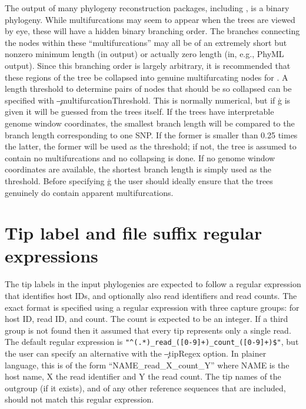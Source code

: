 The output of many phylogeny reconstruction packages, including \R, is a binary phylogeny.
While multifurcations may seem to appear when the trees are viewed by eye, these will have a hidden binary branching order.
The branches connecting the nodes within these ``multifurcations'' may all be of an extremely short but nonzero minimum length (in \R output) or actually zero length (in, e.g., PhyML output).
Since this branching order is largely arbitrary, it is recommended that these regions of the tree be collapsed into genuine multifurcating nodes for \pat.
A length threshold to determine pairs of nodes that should be so collapsed can be specified with \c{--multifurcationThreshold}.
This is normally numerical, but if \c{g} is given it will be guessed from the trees itself. If the trees have interpretable genome window coordinates, the smallest branch length will be compared to the branch length corresponding to one SNP. If the former is smaller than 0.25 times the latter, the former will be used as the threshold; if not, the tree is assumed to contain no multifurcations and no collapsing is done. If no genome window coordinates are available, the shortest branch length is simply used as the threshold. Before specifying \c{g} the user should ideally ensure that the trees genuinely do contain apparent multifurcations.

\section{Tip label and file suffix regular expressions} \label{sec:regexes}

The tip labels in the input phylogenies are expected to follow a regular expression that identifies host IDs, and optionally also read identifiers and read counts.
The exact format is specified using a regular expression with three capture groups: for host ID, read ID, and count.
The count is expected to be an integer.
If a third group is not found then it assumed that every tip represents only a single read.
The default regular expression is \verb|"^(.*)_read_([0-9]+)_count_([0-9]+)$"|, but the user can specify an alternative with the \c{--tipRegex} option.
In plainer language, this is of the form ``NAME\_read\_X\_count\_Y'' where NAME is the host name, X the read identifier and Y the read count.
The tip names of the outgroup (if it exists), and of any other reference sequences that are included, should not match this regular expression.

